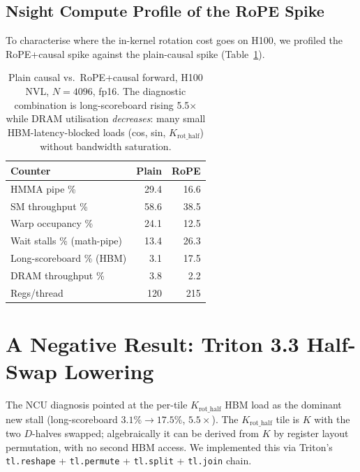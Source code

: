 \documentclass[10pt,twocolumn]{article}
\begin{document}
\subsection{Nsight Compute Profile of the RoPE Spike}
\label{sec:rope_ncu}

To characterise where the in-kernel rotation cost goes on H100, we
profiled the RoPE+causal spike against the plain-causal spike
(Table~\ref{tab:rope_ncu}).

\begin{table}[H]
\centering\small
\begin{tabular}{lrr}
\toprule
\textbf{Counter} & \textbf{Plain} & \textbf{RoPE} \\
\midrule
HMMA pipe \%                & 29.4 & 16.6 \\
SM throughput \%            & 58.6 & 38.5 \\
Warp occupancy \%           & 24.1 & 12.5 \\
Wait stalls \% (math-pipe)  & 13.4 & 26.3 \\
Long-scoreboard \% (HBM)    &  3.1 & 17.5 \\
DRAM throughput \%          &  3.8 &  2.2 \\
Regs/thread                 &  120 &  215 \\
\bottomrule
\end{tabular}
\caption{Plain causal vs.\ RoPE+causal forward, H100 NVL,
$N{=}4096$, fp16. The diagnostic combination is
long-scoreboard rising 5.5$\times$ while DRAM utilisation
\emph{decreases}: many small HBM-latency-blocked loads (cos, sin,
$K_\text{rot\_half}$) without bandwidth saturation.}
\label{tab:rope_ncu}
\end{table}

\section{A Negative Result: Triton 3.3 Half-Swap Lowering}
\label{sec:negative_result}

The NCU diagnosis pointed at the per-tile $K_\text{rot\_half}$ HBM
load as the dominant new stall (long-scoreboard $3.1\% \to 17.5\%$,
$5.5\times$). The $K_\text{rot\_half}$ tile is $K$ with the two
$D$-halves swapped; algebraically it can be derived from $K$ by
register layout permutation, with no second HBM access. We
implemented this via Triton's
\texttt{tl.reshape} + \texttt{tl.permute} + \texttt{tl.split} +
\texttt{tl.join} chain.
\end{document}
